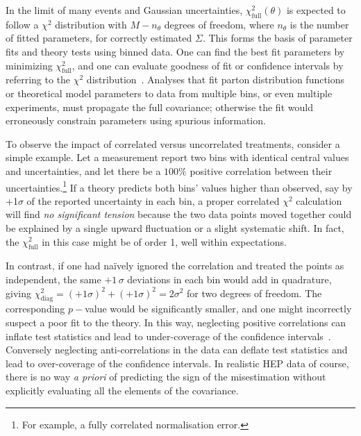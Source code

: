     In the limit of many events and Gaussian uncertainties, $\chi^2_{\text{full}}(\theta)$ is expected to follow a $\chi^2$ distribution with $M - n_{\theta}$ degrees of freedom, where $n_{\theta}$ is the number of fitted parameters, for correctly estimated \(\Sigma\).
    This forms the basis of parameter fits and theory tests using binned data.
    One can find the best fit parameters by minimizing $\chi^2_{\text{full}}$, and one can evaluate goodness of fit or confidence intervals by referring to the $\chi^2$ distribution~\cite{Hogg:2010yz, cowan_bayesian_2006, Verde:2009tu, Goswami:2025dwd, KuzminElectromagneticModel}.
    Analyses that fit parton distribution functions or theoretical model parameters to data from multiple bins, or even multiple experiments, must propagate the full covariance; otherwise the fit would erroneously constrain parameters using spurious information.

    To observe the impact of correlated versus uncorrelated treatments, consider a simple example.
    Let a measurement report two bins with identical central values and uncertainties, and let there be a $100\%$ positive correlation between their uncertainties.\footnote{For example, a fully correlated normalisation error.}
    If a theory predicts both bins' values higher than observed, say by +1$\sigma$ of the reported uncertainty in each bin, a proper correlated $\chi^2$ calculation will find \emph{no significant tension} because the two data points moved together could be explained by a single upward fluctuation or a slight systematic shift.
    In fact, the $\chi^2_{\text{full}}$ in this case might be of order 1, well within expectations.
    
    In contrast, if one had na\"ively ignored the correlation and treated the points as independent, the same $+1\,\sigma$ deviations in each bin would add in quadrature, giving $\chi^2_{\text{diag}} = (+1\sigma)^2 + (+1\sigma)^2 = 2\sigma^2$ for two degrees of freedom.
    The corresponding $p-$value would be significantly smaller, and one might incorrectly suspect a poor fit to the theory.
    In this way, neglecting positive correlations can inflate test statistics and lead to under-coverage of the confidence intervals~\cite{Alexe:2024smm}.
    Conversely neglecting anti-correlations in the data can deflate test statistics and lead to over-coverage of the confidence intervals.
    In realistic HEP data of course, there is no way \textit{a priori} of predicting the sign of the misestimation without explicitly evaluating all the elements of the covariance.
    
